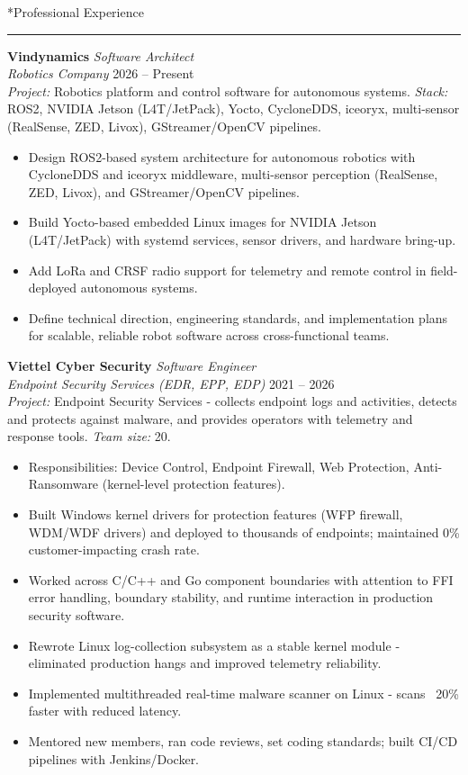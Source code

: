 \documentclass[10pt]{article}
\makeatletter
\renewcommand{\section}{%
  \@startsection{section}{1}{0pt}{0.6ex}{0.2ex}%
  {\normalsize\bfseries}}
\newcommand{\sectionrule}{%
  \par\vspace{-0.4em}%
  {\centering\rule{\linewidth}{0.4pt}\par}%
  \vspace{0.1em}%
}
\makeatother
\begin{document}
\section*{Professional Experience}\sectionrule
\noindent
\textbf{Vindynamics} \hfill \textit{Software Architect} \\
\textit{Robotics Company} \hfill 2026 -- Present \\
\textit{Project:} Robotics platform and control software for autonomous systems. \textit{Stack:} ROS2, NVIDIA Jetson (L4T/JetPack), Yocto, CycloneDDS, iceoryx, multi-sensor (RealSense, ZED, Livox), GStreamer/OpenCV pipelines.

\begin{itemize}
  \item Design ROS2-based system architecture for autonomous robotics with CycloneDDS and iceoryx middleware, multi-sensor perception (RealSense, ZED, Livox), and GStreamer/OpenCV pipelines.
  \item Build Yocto-based embedded Linux images for NVIDIA Jetson (L4T/JetPack) with systemd services, sensor drivers, and hardware bring-up.
  \item Add LoRa and CRSF radio support for telemetry and remote control in field-deployed autonomous systems.
  \item Define technical direction, engineering standards, and implementation plans for scalable, reliable robot software across cross-functional teams.
\end{itemize}

\noindent
\textbf{Viettel Cyber Security} \hfill \textit{Software Engineer} \\
\textit{Endpoint Security Services (EDR, EPP, EDP)} \hfill 2021 -- 2026 \\
\textit{Project:} Endpoint Security Services - collects endpoint logs and activities, detects and protects against malware, and provides operators with telemetry and response tools. \textit{Team size:} 20.

\begin{itemize}
  \item Responsibilities: Device Control, Endpoint Firewall, Web Protection, Anti-Ransomware (kernel-level protection features).
  \item Built Windows kernel drivers for protection features (WFP firewall, WDM/WDF drivers) and deployed to thousands of endpoints; maintained 0\% customer-impacting crash rate.
  \item Worked across C/C++ and Go component boundaries with attention to FFI error handling, boundary stability, and runtime interaction in production security software.
  \item Rewrote Linux log-collection subsystem as a stable kernel module - eliminated production hangs and improved telemetry reliability.
  \item Implemented multithreaded real-time malware scanner on Linux - scans ~20\% faster with reduced latency.
  \item Mentored new members, ran code reviews, set coding standards; built CI/CD pipelines with Jenkins/Docker.
\end{itemize}
\end{document}
